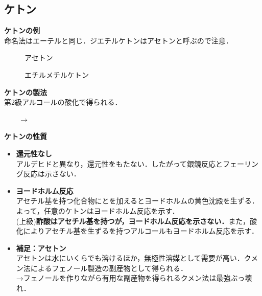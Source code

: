 \documentclass[a4paper,12pt]{ltjsreport}
\begin{document}
\subsection{ケトン}
\noindent \textbf{ケトンの例}\\
命名法はエーテルと同じ．ジエチルケトンはアセトンと呼ぶので注意．\\
\begin{minipage}{0.5\linewidth}
\begin{figure}[H]
    \centering
\caption{アセトン} 
\end{figure}
\end{minipage}
\begin{minipage}{0.5\linewidth}
\begin{figure}[H]
    \centering
\caption{エチルメチルケトン} 
\end{figure}
\end{minipage}
\noindent \textbf{ケトンの製法}\\
第2級アルコールの酸化で得られる．\\[5pt]
\centerline{~~~~$\longrightarrow$~~~~}
\noindent \textbf{ケトンの性質}
\begin{itemize}
    \item\textbf{還元性なし}\\
    アルデヒドと異なり，還元性をもたない．したがって銀鏡反応とフェーリング反応は示さない．
    \item \textbf{ヨードホルム反応}\\
    アセチル基を持つ化合物にとを加えるとヨードホルムの黄色沈殿を生ずる．よって，任意のケトンはヨードホルム反応を示す．\\[5pt]
    (上級)\textbf{酢酸はアセチル基を持つが，ヨードホルム反応を示さない．}また，酸化によりアセチル基を生ずるを持つアルコールもヨードホルム反応を示す．
    \item \textbf{補足：アセトン}\\
    アセトンは水にいくらでも溶けるほか，無極性溶媒として需要が高い．クメン法によるフェノール製造の副産物として得られる．\\
    →フェノールを作りながら有用な副産物を得られるクメン法は最強ぶっ壊れ．
\end{itemize}
\newpage
\end{document}
